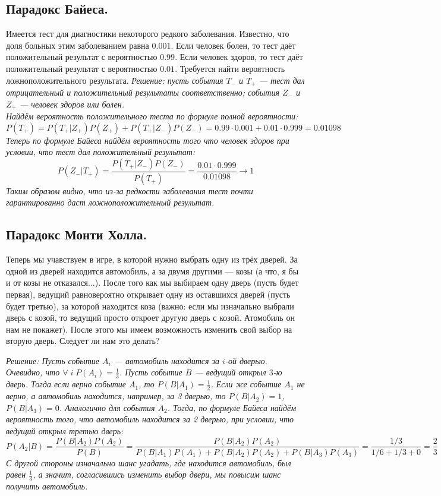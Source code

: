 \subsection{Парадокс Байеса.}
Имеется тест для диагностики некоторого редкого заболевания. Известно, что доля больных этим
заболеванием равна $0.001$. Если человек болен, то тест даёт положительный результат с вероятностью $0.99$.
Если человек здоров, то тест даёт положительный результат с вероятностью $0.01$.
Требуется найти вероятность ложноположительного результата.
\it{Решение:} пусть события $T_{-}$ и $T_{+}$ --- тест дал отрицательный и положительный результаты
соответственно; события $Z_{-}$ и $Z_{+}$ --- человек здоров или болен.\\
Найдём вероятность положительного теста по формуле полной вероятности:
\[
    P(T_{+}) = P(T_{+} | Z_{+})P(Z_{+}) + P(T_{+} | Z_{-})P(Z_{-}) = 0.99 \cdot 0.001 + 0.01 \cdot 0.999 =
    0.01098
\]
Теперь по формуле Байеса найдём вероятность того что человек здоров при условии, что
тест дал положительный результат:
\[
    P(Z_{-} | T_{+}) = \frac{P(T_{+} | Z_{-})P(Z_{-})}{P(T_{+})} = \frac{0.01 \cdot 0.999}{0.01098} \to 1
\]
Таким образом видно, что из-за редкости заболевания тест почти гарантированно даст ложноположительный результат.

\subsection{Парадокс Монти Холла.}
Теперь мы учавствуем в игре, в которой нужно выбрать одну из трёх дверей. За одной из дверей находится автомобиль,
а за двумя другими --- козы (а что, я бы и от козы не отказался...). После того как мы выбираем одну дверь
(пусть будет первая), ведущий равновероятно открывает одну из оставшихся дверей (пусть будет третью),
за которой находится коза (важно: если мы изначально выбрали дверь
с козой, то ведущий просто откроет другую дверь с козой. Атомобиль он нам не покажет). После этого мы имеем возможность
изменить свой выбор на вторую дверь. Следует ли нам это делать?

\it{Решение:} Пусть событие $A_i$ --- автомобиль находится за $i$-ой дверью. Очевидно, что
$\forall\; i\; P(A_i) = \frac{1}{3}$. Пусть событие $B$ --- ведущий открыл $3$-ю дверь. Тогда если верно
событие $A_1$, то $P(B | A_1) = \frac{1}{2}$. Если же событие $A_1$ не верно, а автомобиль находится, например,
за 3 дверью, то $P(B | A_2) = 1$, $P(B | A_3) = 0$. Аналогично для события $A_2$. Тогда, по формуле Байеса найдём
вероятность того, что автомобиль находится за 2 дверью, при условии, что ведущий открыл третью дверь:
\[
    P(A_2 | B) = \frac{P(B | A_2)P(A_2)}{P(B)} =
    \frac{P(B | A_2)P(A_2)}{P(B | A_1)P(A_1) + P(B | A_2)P(A_2) + P(B | A_3)P(A_3)} = \frac{1/3}{1/6 + 1/3 + 0} =
    \frac{2}{3}
\]
С другой стороны изначально шанс угадать, где находится автомобиль, был равен $\frac{1}{3}$, а значит, согласившись
изменить выбор двери, мы повысим шанс получить автомобиль.